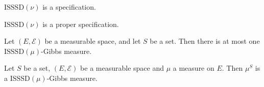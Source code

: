 \begin{lemma}
    \label{lem:isssd-specification}

    $\text{ISSSD}(\nu)$ is a specification.
\end{lemma}

\begin{lemma}
    \label{lem:isssd-proper-specification}

    $\text{ISSSD}(\nu)$ is a proper specification.
\end{lemma}

\begin{lemma}
    \label{lem:gibbs-measure-uniqueness}

    Let $(E, \mathcal{E})$ be a measurable space, and let $S$ be a set. Then there is at most one $\text{ISSSD}(\mu)$-Gibbs measure.
\end{lemma}

\begin{lemma}
    \label{lem:gibbs-measure-existence}

    Let $S$ be a set, $(E, \mathcal{E})$ be a measurable space and $\mu$ a measure on $E$. Then $\mu^S$ is a $\text{ISSSD}(\mu)$-Gibbs measure.
\end{lemma}
